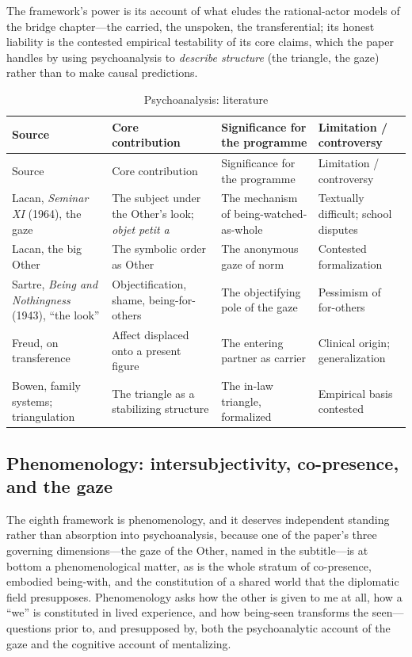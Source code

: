 The framework's power is its account of what eludes the rational-actor models of the bridge chapter---the carried, the unspoken, the transferential; its honest liability is the contested empirical testability of its core claims, which the paper handles by using psychoanalysis to \emph{describe structure} (the triangle, the gaze) rather than to make causal predictions.

\goldrule
\footnotesize
\begin{longtable}{Y Y Y Y}
\caption{Psychoanalysis: literature}\label{p07:tab:lit-psych}\\
\toprule
{}
Source & Core contribution & Significance for the programme & Limitation / controversy \\
\midrule
\endfirsthead
{}
Source & Core contribution & Significance for the programme & Limitation / controversy \\
\midrule
\endhead
Lacan, \emph{Seminar XI} (1964), the gaze & The subject under the Other's look; \emph{objet petit a} & The mechanism of being-watched-as-whole & Textually difficult; school disputes \\
Lacan, the big Other & The symbolic order as Other & The anonymous gaze of norm & Contested formalization \\
Sartre, \emph{Being and Nothingness} (1943), ``the look'' & Objectification, shame, being-for-others & The objectifying pole of the gaze & Pessimism of for-others \\
Freud, on transference & Affect displaced onto a present figure & The entering partner as carrier & Clinical origin; generalization \\
Bowen, family systems; triangulation & The triangle as a stabilizing structure & The in-law triangle, formalized & Empirical basis contested \\
\bottomrule
\end{longtable}

\subsection{Phenomenology: intersubjectivity, co-presence, and the gaze}
The eighth framework is phenomenology, and it deserves independent standing rather than absorption into psychoanalysis, because one of the paper's three governing dimensions---the gaze of the Other, named in the subtitle---is at bottom a phenomenological matter, as is the whole stratum of co-presence, embodied being-with, and the constitution of a shared world that the diplomatic field presupposes. Phenomenology asks how the other is given to me at all, how a ``we'' is constituted in lived experience, and how being-seen transforms the seen---questions prior to, and presupposed by, both the psychoanalytic account of the gaze and the cognitive account of mentalizing.

